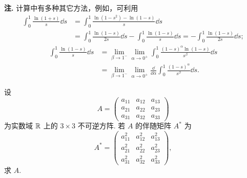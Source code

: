 \begin{solution}
\textbf{注.} 计算中有多种其它方法，例如，可利用
\begin{align*}
\int_0^1\frac{\ln(1+s)}{s}\dd s&=\int_0^1\frac{\ln(1-s^2)-\ln(1-s)}{s}\dd s\\
&=\int_0^1\frac{\ln(1-s)}{2s}\dd s-\int_0^1\frac{\ln(1-s)}{s}\dd s=-\int_0^1\frac{\ln(1-s)}{2s}\dd s;
\end{align*}
\begin{align*}
\int_0^1\frac{\ln(1-s)}{s}\dd s&=\lim_{\beta\to1^-}\lim_{\alpha\to0^+}\int_0^1\frac{(1-s)^\alpha\ln(1-s)}{s^\beta}\dd s\\
&=\lim_{\beta\to1^-}\lim_{\alpha\to0^+}\frac{\dd}{\dd\alpha}\int_0^1\frac{(1-s)^\alpha}{s^\beta}\dd s.
\end{align*}
\end{solution}

设
\[
  A=\begin{pmatrix}
    a_{11} & a_{12} & a_{13}\\
    a_{21} & a_{22} & a_{23}\\
    a_{31} & a_{32} & a_{33}
  \end{pmatrix}
\]
为实数域 $\mathbb{R}$ 上的 $3\times3$ 不可逆方阵. 若 $A$ 的伴随矩阵 $A^*$ 为
\[
  A^*=\begin{pmatrix}
    a_{11}^2 & a_{12}^2 & a_{13}^2\\
    a_{21}^2 & a_{22}^2 & a_{23}^2\\
    a_{31}^2 & a_{32}^2 & a_{33}^2
  \end{pmatrix},
\]
求 $A$.
